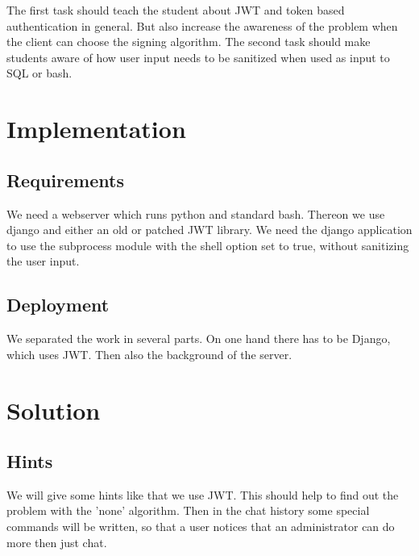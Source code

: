 \documentclass[12pt,a4paper]{article}
\begin{document}
The first task should teach the student about JWT and token based authentication in general. But also increase the awareness of the problem when the client can choose the signing algorithm. %
The second task should make students aware of how user input needs to be sanitized when used as input to SQL or bash. %

\section{Implementation}
\subsection{Requirements}

We need a webserver which runs python and standard bash. Thereon we use django and either an old or patched JWT library. We need the django application to use the subprocess module with the shell option set to true, without sanitizing the user input.

\subsection{Deployment}
We separated the work in several parts. On one hand there has to be Django, which uses JWT. Then also the background of the server.

\section{Solution}

\subsection{Hints}
We will give some hints like that we use JWT. This should help to find out the problem with the 'none' algorithm. Then in the chat history some special commands will be written, so that a user notices that an administrator can do more then just chat.
\end{document}
